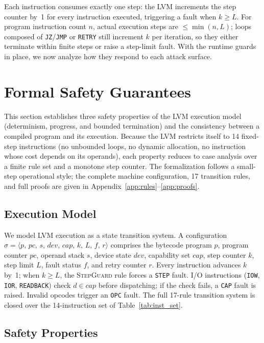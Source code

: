 \documentclass[a4paper,fleqn,longmktitle]{cas-dc}
\begin{document}
Each instruction consumes exactly one step: the LVM increments the step counter by~1 for every instruction executed, triggering a fault when $k \geq L$. For program instruction count $n$, actual execution steps are $\leq \min(n, L)$; loops composed of \texttt{JZ}/\texttt{JMP} or \texttt{RETRY} still increment $k$ per iteration, so they either terminate within finite steps or raise a step-limit fault. With the runtime guards in place, we now analyze how they respond to each attack surface.

\section{Formal Safety Guarantees}
\label{sec:formal}

This section establishes three safety properties of the LVM execution model (determinism, progress, and bounded termination) and the consistency between a compiled program and its execution. Because the LVM restricts itself to 14 fixed-step instructions (no unbounded loops, no dynamic allocation, no instruction whose cost depends on its operands), each property reduces to case analysis over a finite rule set and a monotone step counter. The formalization follows a small-step operational style; the complete machine configuration, 17 transition rules, and full proofs are given in Appendix~\ref{app:rules}--\ref{app:proofs}.

\subsection{Execution Model}
\label{sec:config}

We model LVM execution as a state transition system. A configuration $\sigma = \langle p,\, pc,\, s,\, \mathit{dev},\, \mathit{cap},\, k,\, L,\, f,\, r \rangle$ comprises the bytecode program $p$, program counter $pc$, operand stack $s$, device state $\mathit{dev}$, capability set $\mathit{cap}$, step counter $k$, step limit $L$, fault status $f$, and retry counter $r$. Every instruction advances $k$ by~1; when $k \geq L$, the \textsc{StepGuard} rule forces a \texttt{STEP} fault. I/O instructions (\texttt{IOW}, \texttt{IOR}, \texttt{READBACK}) check $d \in \mathit{cap}$ before dispatching; if the check fails, a \texttt{CAP} fault is raised. Invalid opcodes trigger an \texttt{OPC} fault. The full 17-rule transition system is closed over the 14-instruction set of Table~\ref{tab:inst_set}.

\subsection{Safety Properties}
\label{sec:theorems}
\end{document}
